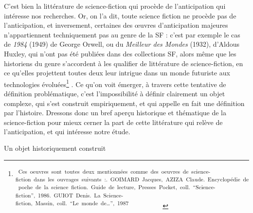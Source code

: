\documentclass[letterpaper,portrait,12pt]{article}
\begin{document}
C'est bien la litt\'{e}rature de science-fiction qui proc\`{e}de de l'anticipation qui int\'{e}resse nos recherches. Or, on l'a dit, toute science fiction ne proc\`{e}de pas de l'anticipation, et inversement, certaines des \oe{}uvres d'anticipation majeures n'appartiennent techniquement pas au genre de la SF : c'est par exemple le cas de \emph{1984} (1949) de George Orwell, ou du \emph{Meilleur des Mondes }(1932), d'Aldous Huxley, qui n'ont pas \'{e}t\'{e} publi\'{e}es dans des collections SF, alors m\^{e}me que les historiens du genre s'accordent \`{a} les qualifier de litt\'{e}rature de science-fiction, en ce qu'elles projettent toutes deux leur intrigue dans un monde futuriste aux technologies \'{e}volu\'{e}es\footnote{\textsuperscript{\newpage
}\textsuperscript{	}\textsuperscript{\ }\textsuperscript{{\tiny Ces\ oeuvres\ sont\ toutes\ deux\ mentionn\'{e}es\ comme\ des\ oeuvres\ de\ science-fiction\ dans\ les\ ouvrages\ suivants\ :}}\textsuperscript{.\ GOIMARD\ Jacques,\ AZIZA\ Claude.\ Encyclop\'{e}die\ de\ poche\ de\ la\ science\ fiction.\ Guide\ de\ lecture,\ Presses\ Pocket,\ coll.\ {``}Science-fiction'',\ 1986}\textsuperscript{{\tiny .\ GUIOT\ Denis.\ La\ Science-fiction,\ Massin,\ coll.\ {``}Le\ monde\ de\ldots{}'',\ 1987\ }}\textsuperscript{\ \ \ \ \ \ \ \ \ \ \ }} . Ce qu'on voit \'{e}merger, \`{a} travers cette tentative de d\'{e}finition probl\'{e}matique, c'est l'impossibilit\'{e} \`{a} d\'{e}finir clairement un objet complexe, qui s'est construit empiriquement, et qui appelle en fait une d\'{e}finition par l'histoire. Dressons donc un bref aper\c{c}u historique et th\'{e}matique de la science-fiction pour mieux cerner la part de cette litt\'{e}rature qui rel\`{e}ve de l'anticipation, et qui int\'{e}resse notre \'{e}tude.








Un objet historiquement construit
\end{document}
